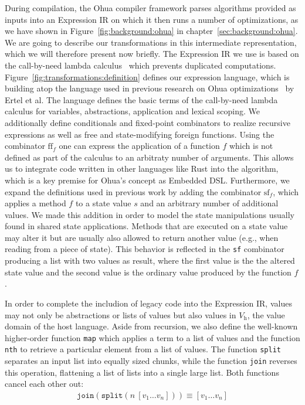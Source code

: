 During compilation, the Ohua compiler framework parses algorithms provided as inputs into an Expression IR on which it then runs a number of optimizations, as we have shown in Figure~\ref{fig:background:ohua} in chapter~\ref{sec:background:ohua}.
We are going to describe our transformations in this intermediate representation, which we will therefore present now briefly.
The Expression IR we use is based on the call-by-need lambda calculus~\cite{ariola1997lambda, ariola1995lambda} which prevents duplicated computations.
Figure~\ref{fig:transformations:definition} defines our expression language, which is building atop the language used in previous research on Ohua optimizations~\cite{ertel2018compiling} by Ertel et al.
The language defines the basic terms of the call-by-need lambda calculus for variables, abstractions, application and lexical scoping.
We additionally define conditionals and fixed-point combinators to realize recursive expressions as well as free and state-modifying foreign functions.
Using the combinator $\text{ff}_f$ one can express the application of a function $f$ which is not defined as part of the calculus to an arbitraty number of arguments.
This allows us to integrate code written in other languages like Rust into the algorithm, which is a key premise for Ohua's concept as Embedded DSL.
Furthermore, we expand the definitions used in previous work by adding the combinator $\text{sf}_f$, which applies a method $f$ to a state value $s$ and an arbitrary number of additional values.
We made this addition in order to model the state manipulations usually found in shared state applications.
Methods that are executed on a state value may alter it but are usually also allowed to return another value (e.g., when reading from a piece of state).
This behavior is reflected in the \texttt{sf} combinator producing a list with two values as result, where the first value is the the altered state value and the second value is the ordinary value produced by the function $f$.

In order to complete the includion of legacy code into the Expression IR, values may not only be abstractions or lists of values but also values in $V_\text{h}$, the value domain of the host language.
Aside from recursion, we also define the well-known higher-order function \texttt{map} which applies a term to a list of values and the function \texttt{nth} to retrieve a particular element from a list of values.
The function \texttt{split} separates an input list into equally sized chunks, while the function \texttt{join} reverses this operation, flattening a list of lists into a single large list.
Both functions cancel each other out:
\begin{align*}
    \texttt{join}(\texttt{split}(n \ [v_1 \dots v_n])) \equiv [v_1 \dots v_n]
\end{align*}

